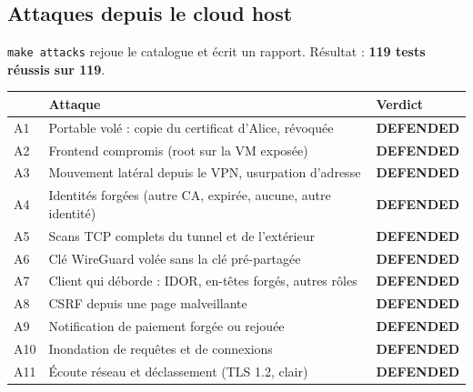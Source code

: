 \documentclass[11pt,a4paper]{article}
\newcommand{\cmd}[1]{\texttt{#1}}
\newcommand{\defended}{\textcolor{ok}{\textbf{DEFENDED}}}
\begin{document}
\subsection{Attaques depuis le cloud host}
\cmd{make attacks} rejoue le catalogue et écrit un rapport. Résultat : \textbf{119 tests réussis sur 119}.
\begin{center}
\begin{tabularx}{\linewidth}{@{}lL l@{}}
\toprule
& \textbf{Attaque} & \textbf{Verdict}\\
\midrule
A1 & Portable volé : copie du certificat d'Alice, révoquée & \defended\\
A2 & Frontend compromis (root sur la VM exposée) & \defended\\
A3 & Mouvement latéral depuis le VPN, usurpation d'adresse & \defended\\
A4 & Identités forgées (autre CA, expirée, aucune, autre identité) & \defended\\
A5 & Scans TCP complets du tunnel et de l'extérieur & \defended\\
A6 & Clé WireGuard volée sans la clé pré-partagée & \defended\\
A7 & Client qui déborde : IDOR, en-têtes forgés, autres rôles & \defended\\
A8 & CSRF depuis une page malveillante & \defended\\
A9 & Notification de paiement forgée ou rejouée & \defended\\
A10 & Inondation de requêtes et de connexions & \defended\\
A11 & Écoute réseau et déclassement (TLS 1.2, clair) & \defended\\
\bottomrule
\end{tabularx}
\end{center}
\end{document}
